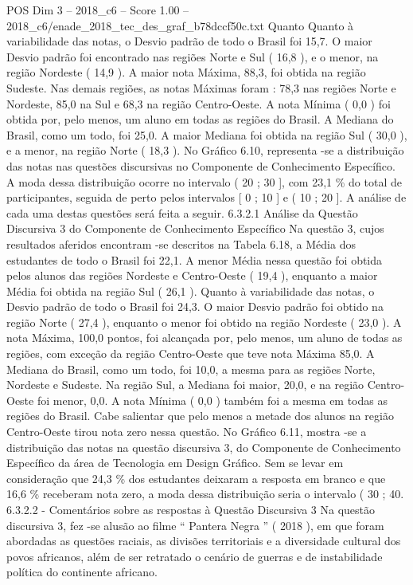 \begin{textsample}{POS Dim 3 – 2018\_c6 – Score 1.00 – 2018\_c6/enade\_2018\_tec\_des\_graf\_b78dccf50c.txt}
Quanto Quanto à variabilidade das notas, o Desvio padrão de todo o Brasil foi 15,7.
O maior Desvio padrão foi encontrado nas regiões Norte e Sul ( 16,8 ), e o menor, na região Nordeste ( 14,9 ).
A maior nota Máxima, 88,3, foi obtida na região Sudeste.
Nas demais regiões, as notas Máximas foram : 78,3 nas regiões Norte e Nordeste, 85,0 na Sul e 68,3 na região Centro-Oeste.
A nota Mínima ( 0,0 ) foi obtida por, pelo menos, um aluno em todas as regiões do Brasil.
A Mediana do Brasil, como um todo, foi 25,0.
A maior Mediana foi obtida na região Sul ( 30,0 ), e a menor, na região Norte ( 18,3 ).
No Gráfico 6.10, representa -se a distribuição das notas nas questões discursivas no Componente de Conhecimento Específico.
A moda dessa distribuição ocorre no intervalo ( 20 ; 30 ], com 23,1 \% do total de participantes, seguida de perto pelos intervalos [ 0 ; 10 ] e ( 10 ; 20 ].
A análise de cada uma destas questões será feita a seguir. 6.3.2.1 Análise da Questão Discursiva 3 do Componente de Conhecimento Específico Na questão 3, cujos resultados aferidos encontram -se descritos na Tabela 6.18, a Média dos estudantes de todo o Brasil foi 22,1.
A menor Média nessa questão foi obtida pelos alunos das regiões Nordeste e Centro-Oeste ( 19,4 ), enquanto a maior Média foi obtida na região Sul ( 26,1 ).
Quanto à variabilidade das notas, o Desvio padrão de todo o Brasil foi 24,3.
O maior Desvio padrão foi obtido na região Norte ( 27,4 ), enquanto o menor foi obtido na região Nordeste ( 23,0 ).
A nota Máxima, 100,0 pontos, foi alcançada por, pelo menos, um aluno de todas as regiões, com exceção da região Centro-Oeste que teve nota Máxima 85,0.
A Mediana do Brasil, como um todo, foi 10,0, a mesma para as regiões Norte, Nordeste e Sudeste.
Na região Sul, a Mediana foi maior, 20,0, e na região Centro-Oeste foi menor, 0,0.
A nota Mínima ( 0,0 ) também foi a mesma em todas as regiões do Brasil.
Cabe salientar que pelo menos a metade dos alunos na região Centro-Oeste tirou nota zero nessa questão.
No Gráfico 6.11, mostra -se a distribuição das notas na questão discursiva 3, do Componente de Conhecimento Específico da área de Tecnologia em Design Gráfico.
Sem se levar em consideração que 24,3 \% dos estudantes deixaram a resposta em branco e que 16,6 \% receberam nota zero, a moda dessa distribuição seria o intervalo ( 30 ; 40. 6.3.2.2 - Comentários sobre as respostas à Questão Discursiva 3 Na questão discursiva 3, fez -se alusão ao filme “ Pantera Negra ” ( 2018 ), em que foram abordadas as questões raciais, as divisões territoriais e a diversidade cultural dos povos africanos, além de ser retratado o cenário de guerras e de instabilidade política do continente africano.

\end{textsample}
